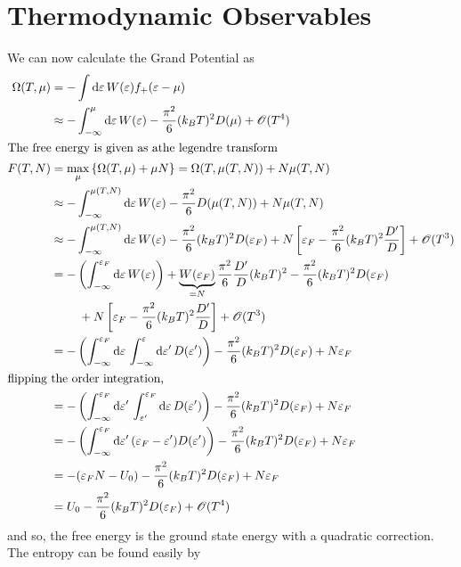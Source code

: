 \section{Thermodynamic Observables}
We can now calculate the Grand Potential as
\begin{align*}
	\Omega(T,\mu) &= -\int\d{\varepsilon}W(\varepsilon) f_+(\varepsilon-\mu)\\
		      &\approx -\int_{-\infty}^\mu\d{\varepsilon}W(\varepsilon) - \frac{\pi^2}{6}(k_BT)^2D(\mu)+\mathscr{O}(T^4)\\
		      \intertext{The free energy is given as athe legendre transform}
	F(T,N) &= \max_{\mu}\left\{\Omega(T,\mu)+\mu N\right\} = \Omega(T,\mu(T,N)) + N\mu(T, N)\\
	       &\approx -\int_{-\infty}^{\mu(T,N)}\d\varepsilon W(\varepsilon) - \frac{\pi^2}{6}D(\mu(T,N)) + N\mu(T,N)\\
	       &\approx -\int_{-\infty}^{\mu(T,N)}\d\varepsilon W(\varepsilon) - \frac{\pi^2}{6}(k_BT)^2D(\varepsilon_F) + N\left[\varepsilon_F - \frac{\pi^2}{6}(k_BT)^2\frac{D'}{D}\right]+\mathscr{O}(T^3)\\
	       &=-\left(\int_{-\infty}^{\varepsilon_F}\d{\varepsilon}W(\varepsilon)\right)+\underbrace{W(\varepsilon_F)}_{=N}\frac{\pi^2}{6}\frac{D'}{D} (k_BT)^2 -\frac{\pi^2}{6}(k_BT)^2D(\varepsilon_F)\\
	       &\hphantom{===}+N\left[\varepsilon_F-\frac{\pi^2}{6}(k_BT)^2\frac{D'}{D}\right]+\mathscr{O}(T^3)\\
	       &=-\left(\int_{-\infty}^{\varepsilon_F}\d\varepsilon \int_{-\infty}^\varepsilon\d{\varepsilon'}D(\varepsilon')\right)-\frac{\pi^2}{6}(k_BT)^2D(\varepsilon_F)+N\varepsilon_F\\
	       \intertext{flipping the order integration,}
	       &=-\left(\int_{-\infty}^{\varepsilon_F}\d{\varepsilon'} \int_{\varepsilon'}^{\varepsilon_F}\d{\varepsilon} D(\varepsilon')\right)-\frac{\pi^2}{6}(k_BT)^2D(\varepsilon_F)+N\varepsilon_F\\
	       &=-\left(\int_{-\infty}^{\varepsilon_F}\d{\varepsilon'}(\varepsilon_F-\varepsilon') D(\varepsilon')\right)-\frac{\pi^2}{6}(k_BT)^2D(\varepsilon_F)+N\varepsilon_F\\
	       &=-(\varepsilon_FN -U_0)-\frac{\pi^2}{6}(k_BT)^2D(\varepsilon_F)+N\varepsilon_F\\
	       &= U_0 - \frac{\pi^2}{6}(k_BT)^2D(\varepsilon_F)+\mathscr{O}(T^4)
\end{align*}
and so, the free energy is the ground state energy with a quadratic correction. The entropy can be found easily by
